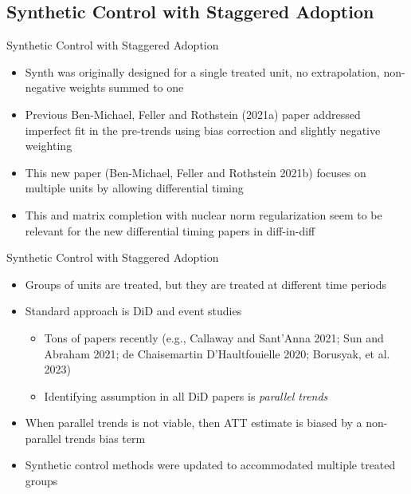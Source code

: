\documentclass{beamer}
\begin{document}
\subsection{Synthetic Control with Staggered Adoption}



\begin{frame}{Synthetic Control with Staggered Adoption}

\begin{itemize}
\item Synth was originally designed for a single treated unit, no extrapolation, non-negative weights summed to one
\item Previous Ben-Michael, Feller and Rothstein (2021a) paper addressed imperfect fit in the pre-trends using bias correction and slightly negative weighting
\item This new paper (Ben-Michael, Feller and Rothstein 2021b) focuses on multiple units by allowing differential timing
\item This and matrix completion with nuclear norm regularization seem to be relevant for the new differential timing papers in diff-in-diff
\end{itemize}

\end{frame}


\begin{frame}{Synthetic Control with Staggered Adoption}

\begin{itemize}
\item Groups of units are treated, but they are treated at different time periods
\item Standard approach is DiD and event studies
	\begin{itemize}
	\item Tons of papers recently (e.g., Callaway and Sant'Anna 2021; Sun and Abraham 2021; de Chaisemartin D'Haultfouielle 2020; Borusyak, et al. 2023)
	\item Identifying assumption in all DiD papers is \emph{parallel trends}
	\end{itemize}
\item When parallel trends is not viable, then ATT estimate is biased by a non-parallel trends bias term
\item Synthetic control methods were updated to accommodated multiple treated groups

\end{itemize}

\end{frame}
\end{document}
